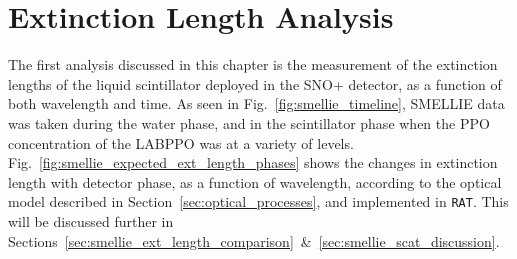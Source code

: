 \section{Extinction Length Analysis}\label{sec:ext_length_analysis}
The first analysis discussed in this chapter is the measurement of the extinction lengths of the liquid scintillator deployed in the SNO+ detector, as a function of both wavelength and time. As seen in Fig.~\ref{fig:smellie_timeline}, SMELLIE data was taken during the water phase, and in the scintillator phase when the PPO concentration of the LABPPO was at a variety of levels. Fig.~\ref{fig:smellie_expected_ext_length_phases} shows the changes in extinction length with detector phase, as a function of wavelength, according to the optical model described in Section~\ref{sec:optical_processes}, and implemented in \texttt{RAT}. This will be discussed further in Sections~\ref{sec:smellie_ext_length_comparison}~\&~\ref{sec:smellie_scat_discussion}.

